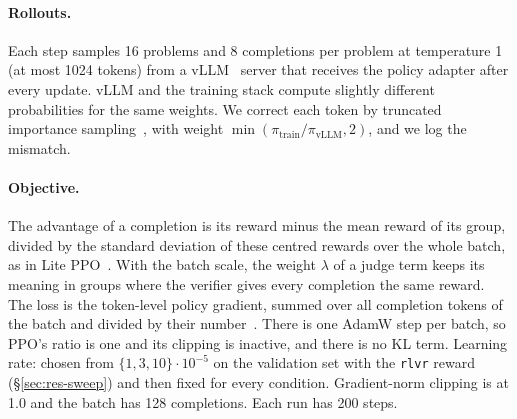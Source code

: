 \paragraph{Rollouts.} Each step samples 16 problems and 8 completions per problem at temperature 1 (at most 1024
tokens) from a vLLM~\cite{kwon2023vllm} server that receives the policy adapter after every update. vLLM and the
training stack compute slightly different probabilities for the same weights. We correct each token by truncated
importance sampling~\cite{yao2025offpolicy}, with weight $\min(\pi_{\text{train}}/\pi_{\text{vLLM}},2)$, and we log the
mismatch.

\paragraph{Objective.} The advantage of a completion is its reward minus the mean reward of its group, divided by the
standard deviation of these centred rewards over the whole batch, as in Lite PPO~\cite{liu2026tricks}. With the batch
scale, the weight $\lambda$ of a judge term keeps its meaning in groups where the verifier gives every completion the same
reward. The loss is the token-level policy gradient, summed over all completion tokens of the batch and divided by
their number~\cite{liu2025understanding}. There is one AdamW step per batch, so PPO's ratio is one and its clipping is
inactive, and there is no KL term. Learning rate: chosen from $\{1,3,10\}\cdot10^{-5}$ on the validation set with the
\texttt{rlvr} reward (\S\ref{sec:res-sweep}) and then fixed for every condition. Gradient-norm clipping is at 1.0 and the
batch has 128 completions. Each run has 200 steps.

